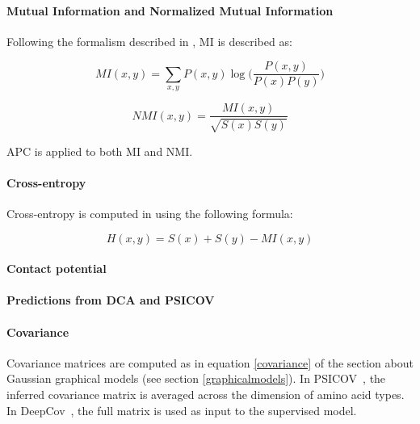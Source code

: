         \paragraph{Mutual Information and Normalized Mutual Information}

            Following the formalism described in \cite{Michel383133}, MI is described as:

            \begin{equation}
                MI(x, y) = \sum\limits_{x, y} P(x, y) \log \Big( \frac{P(x, y)}{P(x) P(y)} \Big)
            \end{equation}

            \begin{equation}
                NMI(x, y) = \frac{MI(x, y)}{\sqrt{S(x) S(y)}}
            \end{equation}

            APC is applied to both MI and NMI.

        \paragraph{Cross-entropy}

            Cross-entropy is computed in \cite{Michel383133} using the following formula:
            
            \begin{equation}
                H(x, y) = S(x) + S(y) - MI(x, y)
            \end{equation}

        \paragraph{Contact potential}

            \todo{}

        \paragraph{Predictions from DCA and PSICOV}

            \todo{}

        \paragraph{Covariance}

            Covariance matrices are computed as in equation \ref{covariance} of the section
            about Gaussian graphical models (see section \ref{graphicalmodels}).
            In PSICOV~\cite{doi:10.1093/bioinformatics/btr638}, the inferred covariance
            matrix is averaged across the dimension of amino acid types.
            In DeepCov~\cite{doi:10.1093/bioinformatics/bty341}, the full matrix is used
            as input to the supervised model.

